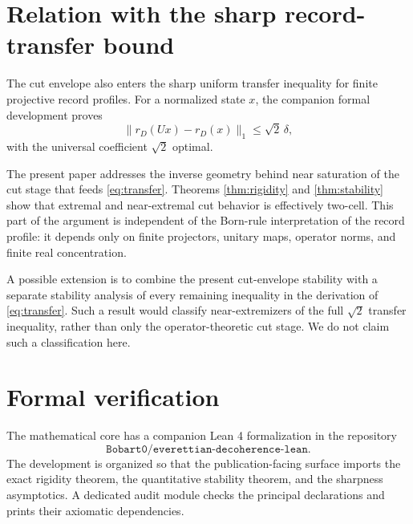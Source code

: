 \documentclass[11pt]{article}
\newcommand{\dd}{\delta}
\begin{document}
\section{Relation with the sharp record-transfer bound}

The cut envelope also enters the sharp uniform transfer inequality for finite
projective record profiles.  For a normalized state $x$, the companion
formal development proves
\begin{equation}\label{eq:transfer}
  \|r_D(Ux)-r_D(x)\|_1
  \le
  \sqrt2\,\dd,
\end{equation}
with the universal coefficient $\sqrt2$ optimal.

The present paper addresses the inverse geometry behind near saturation of
the cut stage that feeds \eqref{eq:transfer}.  Theorems
\ref{thm:rigidity} and \ref{thm:stability} show that extremal and
near-extremal cut behavior is effectively two-cell.  This part of the
argument is independent of the Born-rule interpretation of the record
profile: it depends only on finite projectors, unitary maps, operator norms,
and finite real concentration.

A possible extension is to combine the present cut-envelope stability with a
separate stability analysis of every remaining inequality in the derivation
of \eqref{eq:transfer}.  Such a result would classify near-extremizers of the
full $\sqrt2$ transfer inequality, rather than only the operator-theoretic cut
stage.  We do not claim such a classification here.

\section{Formal verification}

The mathematical core has a companion Lean 4 formalization in the repository
\[
  \texttt{Bobart0/everettian-decoherence-lean}.
\]
The development is organized so that the publication-facing surface imports
the exact rigidity theorem, the quantitative stability theorem, and the
sharpness asymptotics.  A dedicated audit module checks the principal
declarations and prints their axiomatic dependencies.
\end{document}
